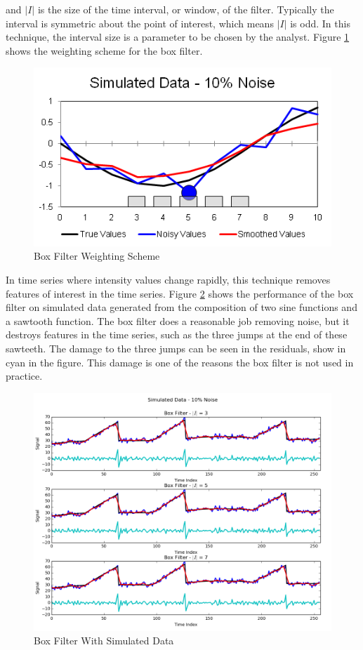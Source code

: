 \documentclass[11pt]{article}
\theoremstyle{definition}
\begin{document}
\noindent
and $\lvert I \rvert$ is the size of the time interval, or window, of
the filter. Typically the interval is symmetric about the point of
interest, which means $\lvert I \rvert$ is odd. In this technique, the
interval size is a parameter to be chosen by the analyst. Figure
\ref{boxdemo} shows the weighting scheme for the box filter.


\begin{figure}[h!]
\centering
\includegraphics[width = 0.4 \textwidth]{BoxDemo.png}
\caption{Box Filter Weighting Scheme}
\label{boxdemo}
\end{figure}

In time series where intensity values change rapidly, this technique
removes features of interest in the time series. Figure
\ref{boxcompare} shows the performance of the box filter on simulated
data generated from the composition of two sine functions and a
sawtooth function. The box filter does a reasonable job removing
noise, but it destroys features in the time series, such as the three
jumps at the end of these sawteeth. The damage to the three jumps can
be seen in the residuals, show in cyan in the figure. This damage is
one of the reasons the box filter is not used in practice.

\begin{figure}[h!]
\centering
\includegraphics[width = 0.9 \textwidth]{BoxCompare.png}
\caption{Box Filter With Simulated Data}
\label{boxcompare}
\end{figure}
\end{document}

